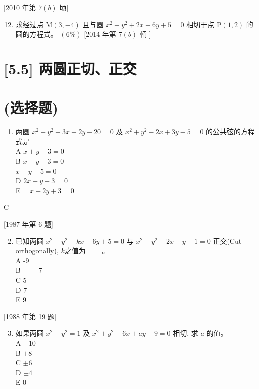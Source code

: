 \documentclass[10pt]{article}
\begin{document}
[2010 年第 $7(b)$ 顷]

\begin{enumerate}
  \setcounter{enumi}{11}
  \item 求经过点 $\mathrm{M}(3,-4)$ 且与圆 $x^{2}+y^{2}+2 x-6 y+5=0$ 相切于点 $\mathrm{P}(1,2)$ 的圆的方程式。 $(6 \%)$ [2014 年第 $7(b)$ 輀 $]$
\end{enumerate}

\section*{[5.5] 两圆正切、正交}
\section*{(选择题)}
\begin{enumerate}
  \item 两圆 $x^{2}+y^{2}+3 x-2 y-20=0$ 及 $x^{2}+y^{2}-2 x+3 y-5=0$ 的公共弦的方程式是\\
A $x+y-3=0$\\
B $x-y-3=0$\\
$x-y-5=0$\\
D $2 x+y-3=0$\\
E $\quad x-2 y+3=0$
\end{enumerate}

C

[1987 年第 6 题]

\begin{enumerate}
  \setcounter{enumi}{1}
  \item 已知两圆 $x^{2}+y^{2}+k x-6 y+5=0$ 与 $x^{2}+y^{2}+2 x+y-1=0$ 正交(Cut orthogonally), $k$之值为 $\qquad$。\\
A -9\\
B $\quad-7$\\
C 5\\
D 7\\
E 9
\end{enumerate}

[1988 年第 19 题]

\begin{enumerate}
  \setcounter{enumi}{2}
  \item 如果两圆 $x^{2}+y^{2}=1$ 及 $x^{2}+y^{2}-6 x+a y+9=0$ 相切, 求 $a$ 的值。\\
A $\pm 10$\\
B $\pm 8$\\
C $\pm 6$\\
D $\pm 4$\\
E 0
\end{enumerate}
\end{document}
